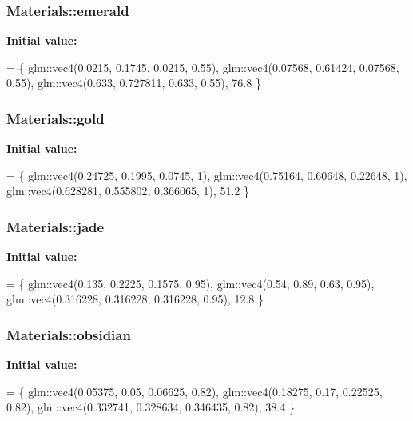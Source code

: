 \subsubsection[{\texorpdfstring{emerald}{emerald}}]{ Materials\+::emerald}\hypertarget{namespace_materials_af0d20fbbd84514c88dc37f22beb5ff8e}{}\label{namespace_materials_af0d20fbbd84514c88dc37f22beb5ff8e}
{\bfseries Initial value\+:}
\begin{DoxyCode}
= \{
        glm::vec4(0.0215, 0.1745, 0.0215, 0.55),
        glm::vec4(0.07568, 0.61424, 0.07568, 0.55),
        glm::vec4(0.633, 0.727811, 0.633, 0.55),
        76.8
    \}
\end{DoxyCode}
\subsubsection[{\texorpdfstring{gold}{gold}}]{ Materials\+::gold}\hypertarget{namespace_materials_aaa1f200530d72d7ee11f5fc492f82bf9}{}\label{namespace_materials_aaa1f200530d72d7ee11f5fc492f82bf9}
{\bfseries Initial value\+:}
\begin{DoxyCode}
= \{
        glm::vec4(0.24725, 0.1995, 0.0745, 1),
        glm::vec4(0.75164, 0.60648, 0.22648, 1),
        glm::vec4(0.628281, 0.555802, 0.366065, 1),
        51.2
    \}
\end{DoxyCode}
\subsubsection[{\texorpdfstring{jade}{jade}}]{ Materials\+::jade}\hypertarget{namespace_materials_a5fc7c043507c2cea752070b593ca85aa}{}\label{namespace_materials_a5fc7c043507c2cea752070b593ca85aa}
{\bfseries Initial value\+:}
\begin{DoxyCode}
= \{
        glm::vec4(0.135, 0.2225, 0.1575, 0.95),
        glm::vec4(0.54, 0.89, 0.63, 0.95),
        glm::vec4(0.316228, 0.316228, 0.316228, 0.95),
        12.8
    \}
\end{DoxyCode}
\subsubsection[{\texorpdfstring{obsidian}{obsidian}}]{ Materials\+::obsidian}\hypertarget{namespace_materials_ac8f37f7d2fdb484dee3ceab10190ba5f}{}\label{namespace_materials_ac8f37f7d2fdb484dee3ceab10190ba5f}
{\bfseries Initial value\+:}
\begin{DoxyCode}
= \{
        glm::vec4(0.05375, 0.05, 0.06625, 0.82),
        glm::vec4(0.18275, 0.17, 0.22525, 0.82),
        glm::vec4(0.332741, 0.328634, 0.346435, 0.82),
        38.4
    \}
\end{DoxyCode}
